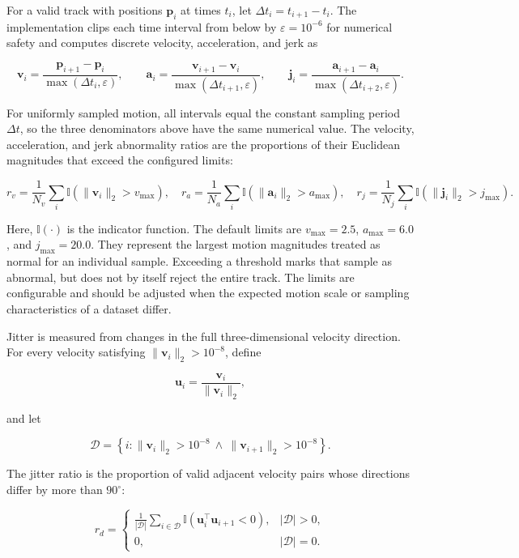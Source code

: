 \documentclass[11pt,oneside]{report}
\begin{document}
For a valid track with positions $\mathbf{p}_i$ at times $t_i$, let $\Delta t_i=t_{i+1}-t_i$. The implementation clips each time interval from below by $\varepsilon=10^{-6}$ for numerical safety and computes discrete velocity, acceleration, and jerk as

\[
\mathbf{v}_i =
\frac{\mathbf{p}_{i+1}-\mathbf{p}_i}
{\max(\Delta t_i,\varepsilon)},
\qquad
\mathbf{a}_i =
\frac{\mathbf{v}_{i+1}-\mathbf{v}_i}
{\max(\Delta t_{i+1},\varepsilon)},
\qquad
\mathbf{j}_i =
\frac{\mathbf{a}_{i+1}-\mathbf{a}_i}
{\max(\Delta t_{i+2},\varepsilon)}.
\]

For uniformly sampled motion, all intervals equal the constant sampling period $\Delta t$, so the three denominators above have the same numerical value. The velocity, acceleration, and jerk abnormality ratios are the proportions of their Euclidean magnitudes that exceed the configured limits:

\[
r_v =
\frac{1}{N_v}\sum_i
\mathbb{I}\!\left(\lVert\mathbf{v}_i\rVert_2>v_{\max}\right),
\quad
r_a =
\frac{1}{N_a}\sum_i
\mathbb{I}\!\left(\lVert\mathbf{a}_i\rVert_2>a_{\max}\right),
\quad
r_j =
\frac{1}{N_j}\sum_i
\mathbb{I}\!\left(\lVert\mathbf{j}_i\rVert_2>j_{\max}\right).
\]

Here, $\mathbb{I}(\cdot)$ is the indicator function. The default limits are $v_{\max}=2.5$, $a_{\max}=6.0$, and $j_{\max}=20.0$. They represent the largest motion magnitudes treated as normal for an individual sample. Exceeding a threshold marks that sample as abnormal, but does not by itself reject the entire track. The limits are configurable and should be adjusted when the expected motion scale or sampling characteristics of a dataset differ.

Jitter is measured from changes in the full three-dimensional velocity direction. For every velocity satisfying $\lVert\mathbf{v}_i\rVert_2>10^{-8}$, define

\[
\mathbf{u}_i =
\frac{\mathbf{v}_i}{\lVert\mathbf{v}_i\rVert_2},
\]

and let

\[
\mathcal{D} =
\left\{
i:
\lVert\mathbf{v}_i\rVert_2>10^{-8}
\ \land\
\lVert\mathbf{v}_{i+1}\rVert_2>10^{-8}
\right\}.
\]

The jitter ratio is the proportion of valid adjacent velocity pairs whose
directions differ by more than $90^\circ$:

\[
r_d =
\begin{cases}
\displaystyle
\frac{1}{|\mathcal{D}|}
\sum_{i\in\mathcal{D}}
\mathbb{I}\!\left(
\mathbf{u}_i^\top\mathbf{u}_{i+1}<0
\right),
& |\mathcal{D}|>0, \\[6pt]
0,
& |\mathcal{D}|=0.
\end{cases}
\]
\end{document}
